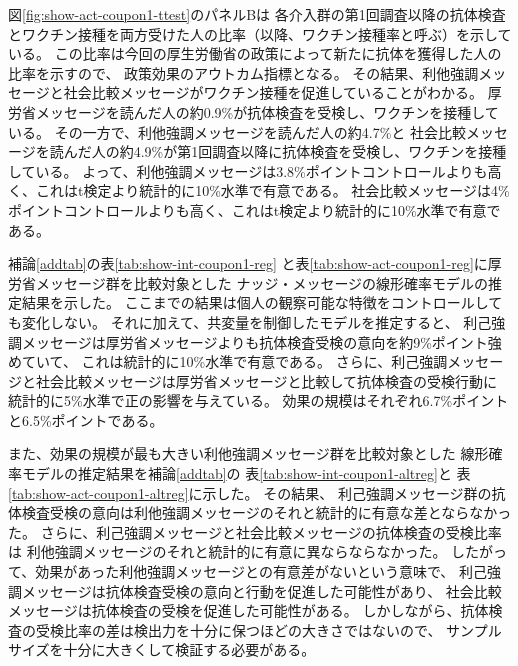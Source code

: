 \documentclass[
  11pt,
  a4paper,
]{article}
\begin{document}
図\ref{fig:show-act-coupon1-ttest}のパネルBは
各介入群の第1回調査以降の抗体検査とワクチン接種を両方受けた人の比率（以降、ワクチン接種率と呼ぶ）を示している。
この比率は今回の厚生労働省の政策によって新たに抗体を獲得した人の比率を示すので、
政策効果のアウトカム指標となる。
その結果、利他強調メッセージと社会比較メッセージがワクチン接種を促進していることがわかる。
厚労省メッセージを読んだ人の約0.9\%が抗体検査を受検し、ワクチンを接種している。
その一方で、利他強調メッセージを読んだ人の約4.7\%と
社会比較メッセージを読んだ人の約4.9\%が第1回調査以降に抗体検査を受検し、ワクチンを接種している。
よって、利他強調メッセージは3.8\%ポイントコントロールよりも高く、これはt検定より統計的に10\%水準で有意である。
社会比較メッセージは4\%ポイントコントロールよりも高く、これはt検定より統計的に10\%水準で有意である。

補論\ref{addtab}の表\ref{tab:show-int-coupon1-reg}
と表\ref{tab:show-act-coupon1-reg}に厚労省メッセージ群を比較対象とした
ナッジ・メッセージの線形確率モデルの推定結果を示した。
ここまでの結果は個人の観察可能な特徴をコントロールしても変化しない。
それに加えて、共変量を制御したモデルを推定すると、
利己強調メッセージは厚労省メッセージよりも抗体検査受検の意向を約9\%ポイント強めていて、
これは統計的に10\%水準で有意である。
さらに、利己強調メッセージと社会比較メッセージは厚労省メッセージと比較して抗体検査の受検行動に
統計的に5\%水準で正の影響を与えている。
効果の規模はそれぞれ6.7\%ポイントと6.5\%ポイントである。

また、効果の規模が最も大きい利他強調メッセージ群を比較対象とした
線形確率モデルの推定結果を補論\ref{addtab}の
表\ref{tab:show-int-coupon1-altreg}と
表\ref{tab:show-act-coupon1-altreg}に示した。
その結果、
利己強調メッセージ群の抗体検査受検の意向は利他強調メッセージのそれと統計的に有意な差とならなかった。
さらに、利己強調メッセージと社会比較メッセージの抗体検査の受検比率は
利他強調メッセージのそれと統計的に有意に異ならならなかった。
したがって、効果があった利他強調メッセージとの有意差がないという意味で、
利己強調メッセージは抗体検査受検の意向と行動を促進した可能性があり、
社会比較メッセージは抗体検査の受検を促進した可能性がある。
しかしながら、抗体検査の受検比率の差は検出力を十分に保つほどの大きさではないので、
サンプルサイズを十分に大きくして検証する必要がある。
\end{document}
